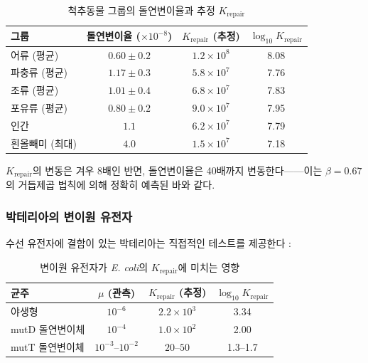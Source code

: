 \documentclass[12pt,a4paper]{article}
\theoremstyle{remark}
\begin{document}
	\begin{table}[htbp]
		\centering
		\caption{척추동물 그룹의 돌연변이율과 추정 \(K_{\text{repair}}\) \cite{Bergeron2023}}
		\label{tab:vertebrate-mutations}
		\small
		\begin{tabular}{lccc}
			\toprule
			\textbf{그룹} & \textbf{돌연변이율 (\(\times 10^{-8}\))} & \textbf{\(K_{\text{repair}}\) (추정)} & $\log_{10} K_{\text{repair}}$ \\
			\midrule
			어류 (평균) & $0.60 \pm 0.2$ & $1.2 \times 10^8$ & 8.08 \\
			파충류 (평균) & $1.17 \pm 0.3$ & $5.8 \times 10^7$ & 7.76 \\
			조류 (평균) & $1.01 \pm 0.4$ & $6.8 \times 10^7$ & 7.83 \\
			포유류 (평균) & $0.80 \pm 0.2$ & $9.0 \times 10^7$ & 7.95 \\
			인간 & $1.1$ & $6.2 \times 10^7$ & 7.79 \\
			흰올빼미 (최대) & $4.0$ & $1.5 \times 10^7$ & 7.18 \\
			\bottomrule
		\end{tabular}
	\end{table}
	
	\(K_{\text{repair}}\)의 변동은 겨우 8배인 반면, 돌연변이율은 40배까지 변동한다——이는 \(\beta = 0.67\)의 거듭제곱 법칙에 의해 정확히 예측된 바와 같다.
	
	\subsubsection{박테리아의 변이원 유전자}
	
	수선 유전자에 결함이 있는 박테리아는 직접적인 테스트를 제공한다 \cite{Drake1991}:
	
	\begin{table}[htbp]
		\centering
		\caption{변이원 유전자가 \textit{E. coli}의 \(K_{\text{repair}}\)에 미치는 영향 \cite{Drake1991}}
		\label{tab:mutators}
		\small
		\begin{tabular}{lccc}
			\toprule
			\textbf{균주} & $\mu$ (관측) & $K_{\text{repair}}$ (추정) & $\log_{10} K_{\text{repair}}$ \\
			\midrule
			야생형 & $10^{-6}$ & $2.2 \times 10^3$ & 3.34 \\
			mutD 돌연변이체 & $10^{-4}$ & $1.0 \times 10^2$ & 2.00 \\
			mutT 돌연변이체 & $10^{-3}$--$10^{-2}$ & $20$--$50$ & 1.3--1.7 \\
			\bottomrule
		\end{tabular}
	\end{table}
	
\end{document}
